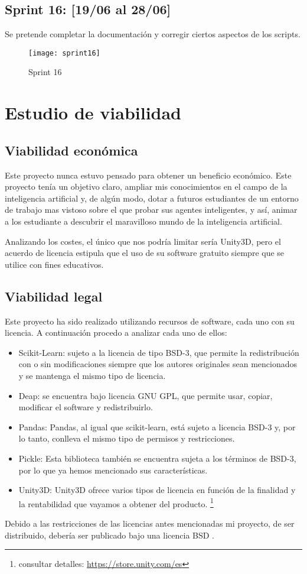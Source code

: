\subsection{Sprint 16: [19/06 al 28/06]}

Se pretende completar la documentación y corregir ciertos aspectos de los scripts.

\begin{figure}[h!]
    \centering
    \texttt{[image: sprint16]}
    \caption{Sprint 16}
    \label{fig:s16}
\end{figure}


\section{Estudio de viabilidad}

\subsection{Viabilidad económica}
Este proyecto nunca estuvo pensado para obtener un beneficio económico. Este proyecto tenía un objetivo claro, ampliar mis conocimientos en el campo de la inteligencia artificial y, de algún modo, dotar a futuros estudiantes de un entorno de trabajo mas vistoso sobre el que probar sus agentes inteligentes, y así, animar a los estudiante a descubrir el maravilloso mundo de la inteligencia artificial.

Analizando los costes, el único que nos podría limitar sería Unity3D, pero el acuerdo de licencia estipula que el uso de su software gratuito siempre que se utilice con fines educativos.

\subsection{Viabilidad legal}

Este proyecto ha sido realizado utilizando recursos de software, cada uno con su licencia. A continuación procedo a analizar cada uno de ellos:
\begin{itemize}
    \item Scikit-Learn: sujeto a la licencia de tipo BSD-3, que permite la redistribución con o sin modificaciones siempre que los autores originales sean mencionados y se mantenga el mismo tipo de licencia.
    \item Deap: se encuentra bajo licencia GNU GPL, que permite usar, copiar, modificar el software y redistribuirlo.
    \item Pandas: Pandas, al igual que scikit-learn, está sujeto a licencia BSD-3 y, por lo tanto, conlleva el mismo tipo de permisos y restricciones.
    \item Pickle: Esta biblioteca también se encuentra sujeta a los términos de BSD-3, por lo que ya hemos mencionado sus características. 
    \item Unity3D: Unity3D ofrece varios tipos de licencia en función de la finalidad y la rentabilidad que vayamos a obtener del producto. \footnote{consultar detalles: \url{https://store.unity.com/es} }
\end{itemize}


Debido a las restricciones de las licencias antes mencionadas mi proyecto, de ser distribuido, debería ser publicado bajo una licencia BSD \cite{wiki:BSD}.